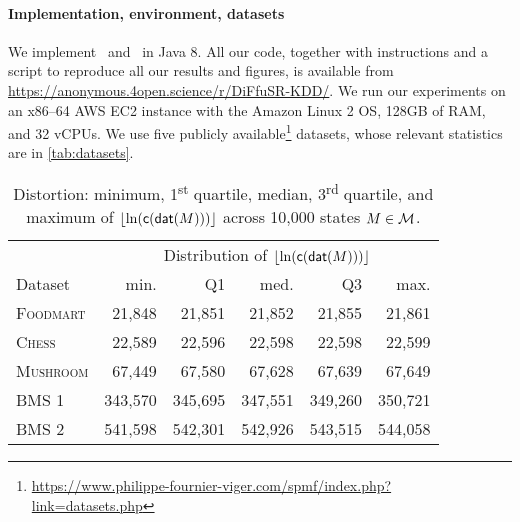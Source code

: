 \paragraph{Implementation, environment, datasets}
We implement \algo\ and \gioalgo\ in Java 8. All our code, together with
instructions and a script to reproduce all our results and figures, is available
from \url{https://anonymous.4open.science/r/DiFfuSR-KDD/}. We run our
experiments on an x86--64 AWS EC2 instance with the Amazon Linux 2 OS, 128GB of
RAM, and 32 vCPUs. We use five publicly
available\footnote{\url{https://www.philippe-fournier-viger.com/spmf/index.php?link=datasets.php}}
datasets, whose relevant statistics are in \cref{tab:datasets}. %

\begin{table}[htb]
  \caption{Distortion: minimum, 1\textsuperscript{st} quartile, median,
    3\textsuperscript{rd} quartile, and maximum of
    $\lfloor\ln(\mathsf{c}\lparen\mathsf{dat}\lparen M\rparen\rparen)\rfloor$ across 10,000 states $M \in
\mathcal{M}$.}\label{tab:distortion}
  {\small
  \begin{tabular}{lrrrrr}
    & \multicolumn{5}{c}{Distribution of $\lfloor \ln(\mathsf{c}\lparen\mathsf{dat}\lparen M\rparen\rparen)
    \rfloor$} \\
    \cmidrule(lr){2-6}
    Dataset & min. & Q1 & med. & Q3 & max. \\
    \midrule
    \textsc{Foodmart} & 21,848 & 21,851 & 21,852 & 21,855 & 21,861 \\
    \textsc{Chess} & 22,589 & 22,596 & 22,598 & 22,598 & 22,599 \\
    \textsc{Mushroom} & 67,449 & 67,580 & 67,628 & 67,639 & 67,649 \\
    \textsc{BMS 1} & 343,570 & 345,695 & 347,551 & 349,260 & 350,721 \\
    \textsc{BMS 2} & 541,598 & 542,301 & 542,926 & 543,515 & 544,058
  \end{tabular}
  } %
\end{table}

